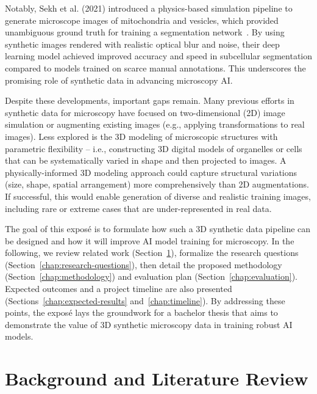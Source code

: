 \documentclass[
oneside,      %
openany       %
]{imc-inf}
\begin{document}
	Notably, Sekh et al. (2021) introduced a physics-based simulation pipeline to generate microscope images of mitochondria and vesicles, which provided unambiguous ground truth for training a segmentation network~\cite{sekh2021}. By using synthetic images rendered with realistic optical blur and noise, their deep learning model achieved improved accuracy and speed in subcellular segmentation compared to models trained on scarce manual annotations. This underscores the promising role of synthetic data in advancing microscopy AI.
	
	Despite these developments, important gaps remain. Many previous efforts in synthetic data for microscopy have focused on two-dimensional (2D) image simulation or augmenting existing images (e.g., applying transformations to real images). Less explored is the 3D modeling of microscopic structures with parametric flexibility – i.e., constructing 3D digital models of organelles or cells that can be systematically varied in shape and then projected to images. A physically-informed 3D modeling approach could capture structural variations (size, shape, spatial arrangement) more comprehensively than 2D augmentations. If successful, this would enable generation of diverse and realistic training images, including rare or extreme cases that are under-represented in real data.
	
	The goal of this exposé is to formulate how such a 3D synthetic data pipeline can be designed and how it will improve AI model training for microscopy. In the following, we review related work (Section~\ref{chap:related-work}), formalize the research questions (Section~\ref{chap:research-questions}), then detail the proposed methodology (Section~\ref{chap:methodology}) and evaluation plan (Section~\ref{chap:evaluation}). Expected outcomes and a project timeline are also presented (Sections~\ref{chap:expected-results} and~\ref{chap:timeline}). By addressing these points, the exposé lays the groundwork for a bachelor thesis that aims to demonstrate the value of 3D synthetic microscopy data in training robust AI models.
	
	
	\section{Background and Literature Review}\label{chap:related-work}
	
\end{document}
